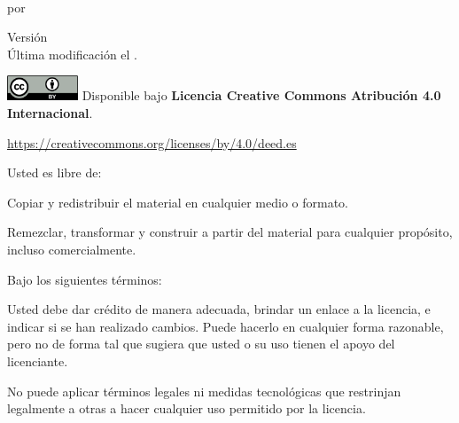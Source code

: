 \vspace*{\fill}
%
\textit{\Title{}} \\
por \Soler{}


\vspace{4em}
%
Versión \ThesisVersion{} \\
Última modificación el .

\vspace{5em}
%
\includegraphics[height=2em]{figs/logos/cc-by.png}
%
Disponible bajo
{\bf Licencia Creative Commons Atribución 4.0 Internacional}.

\noindent
\url{https://creativecommons.org/licenses/by/4.0/deed.es}

\vspace{1em}

\noindent
Usted es libre de:

\begin{description}[labelindent=0.5cm]
    \item[Compartir:]{
        Copiar y redistribuir el material en cualquier medio o formato.
    }
    \item[Adaptar:]{
        Remezclar, transformar y construir a partir del material
        para cualquier propósito, incluso comercialmente.
    }
\end{description}
%
Bajo los siguientes términos:

\begin{description}[labelindent=0.5cm]
    \item[Atribución:]{
        Usted debe dar crédito de manera adecuada, brindar un enlace a la
        licencia, e indicar si se han realizado cambios. Puede hacerlo en cualquier
        forma razonable, pero no de forma tal que sugiera que usted o su uso tienen el
        apoyo del licenciante.
    }
    \item[No hay restricciones adicionales:]{
        No puede aplicar términos legales ni medidas tecnológicas que
        restrinjan legalmente a otras a hacer cualquier uso permitido por la
        licencia.
    }
\end{description}
